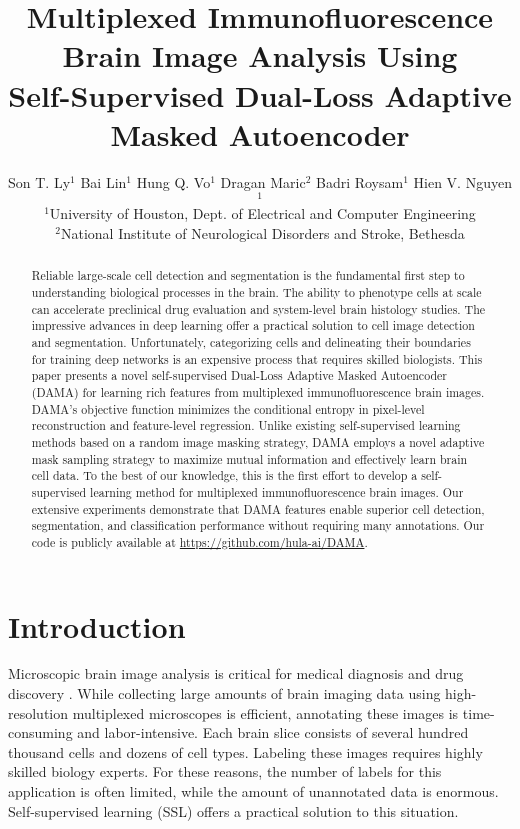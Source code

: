 \documentclass[10pt,twocolumn,letterpaper]{article}
\newcommand{\authorskip}{\hspace{2.5mm}}
\begin{document}
\title{Multiplexed Immunofluorescence Brain Image Analysis Using \\ Self-Supervised Dual-Loss Adaptive Masked Autoencoder}

\author{Son T. Ly$^{1}$ \authorskip Bai Lin$^{1}$ \authorskip Hung Q. Vo$^{1}$ \authorskip Dragan Maric$^{2}$ \authorskip Badri Roysam$^{1}$ \authorskip Hien V. Nguyen$^{1}$ \\ [2mm]
$^{1}$University of Houston, Dept. of Electrical and Computer Engineering \\
$^{2}$National Institute of Neurological Disorders and Stroke, Bethesda}
\maketitle



\begin{abstract}
Reliable large-scale cell detection and segmentation is the fundamental first step to understanding biological processes in the brain. The ability to phenotype cells at scale can accelerate preclinical drug evaluation and system-level brain histology studies. The impressive advances in deep learning offer a practical solution to cell image detection and segmentation. Unfortunately, categorizing cells and delineating their boundaries for training deep networks is an expensive process that requires skilled biologists. This paper presents a novel self-supervised  Dual-Loss Adaptive Masked Autoencoder (DAMA) for learning rich features from multiplexed immunofluorescence brain images. DAMA's objective function minimizes the conditional entropy in pixel-level reconstruction and feature-level regression. Unlike existing self-supervised learning methods based on a random image masking strategy, DAMA employs a novel adaptive mask sampling strategy to maximize mutual information and effectively learn brain cell data. To the best of our knowledge, this is the first effort to develop a self-supervised learning method for multiplexed immunofluorescence brain images. Our extensive experiments demonstrate that DAMA features enable superior cell detection, segmentation, and classification performance without requiring many annotations. Our code is publicly available at \url{https://github.com/hula-ai/DAMA}.
\end{abstract}

\section{Introduction}
Microscopic brain image analysis is critical for medical diagnosis and drug discovery \cite{maric2021whole}. While collecting large amounts of brain imaging data using high-resolution multiplexed microscopes is efficient, annotating these images is time-consuming and labor-intensive. Each brain slice consists of several hundred thousand cells and dozens of cell types. Labeling these images requires highly skilled biology experts. For these reasons, the number of labels for this application is often limited, while the amount of unannotated data is enormous. Self-supervised learning (SSL) offers a practical solution to this situation. 
\end{document}
